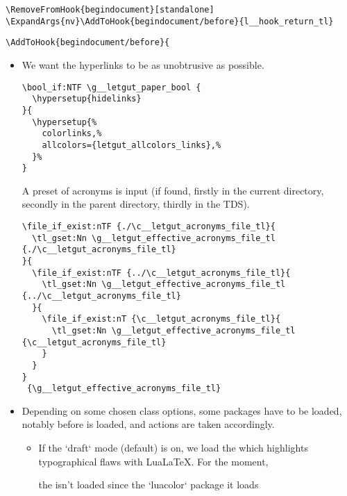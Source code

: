 \documentclass{letgut}
\begin{document}
\begin{lstlisting}
\RemoveFromHook{begindocument}[standalone]
\ExpandArgs{nv}\AddToHook{begindocument/before}{l__hook_return_tl}
\end{lstlisting}

\begin{lstlisting}
\AddToHook{begindocument/before}{
\end{lstlisting}

\begin{itemize}
\item We want the hyperlinks to be as unobtrusive as possible.
\begin{lstlisting}
\bool_if:NTF \g__letgut_paper_bool {
  \hypersetup{hidelinks}
}{
  \hypersetup{%
    colorlinks,%
    allcolors={letgut_allcolors_links},%
  }%
}
\end{lstlisting}

A preset of acronyms is input (if found, firstly in the current directory,
secondly in the parent directory, thirdly in the TDS).
\begin{lstlisting}
\file_if_exist:nTF {./\c__letgut_acronyms_file_tl}{
  \tl_gset:Nn \g__letgut_effective_acronyms_file_tl {./\c__letgut_acronyms_file_tl}
}{
  \file_if_exist:nTF {../\c__letgut_acronyms_file_tl}{
    \tl_gset:Nn \g__letgut_effective_acronyms_file_tl {../\c__letgut_acronyms_file_tl}
  }{
    \file_if_exist:nT {\c__letgut_acronyms_file_tl}{
      \tl_gset:Nn \g__letgut_effective_acronyms_file_tl {\c__letgut_acronyms_file_tl}
    }
  }
}
 {\g__letgut_effective_acronyms_file_tl}
\end{lstlisting}

\item Depending on some chosen class options, some packages have to be loaded,
notably before  is loaded, and actions are taken
accordingly.
\begin{itemize}
\item If the `draft` mode (default) is on, we load the  which
highlights typographical flaws with LuaLaTeX. For the moment,

the  isn't loaded since  the `luacolor`
package it loads


\end{itemize}
\end{itemize}
\end{document}
